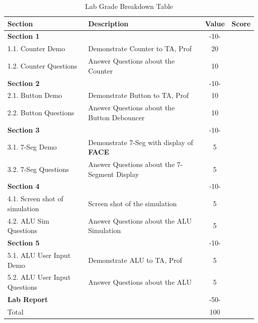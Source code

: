 \documentclass{article}
\begin{document}
\begin{table}[!htb]
  \begin{center}
    \begin{tabular}[width=0.8\textwidth]{|l|l|c|l|}
       \hline
       Section & Description & Value & Score\\
       \hline 
       \multicolumn{2}{|l}{\textbf{Section 1}}  & -10- &\\
       \hline
       1.1. Counter Demo & Demonstrate Counter to TA, Prof & 20 &\\
       1.2. Counter Questions & Answer Questions about the Counter & 10 &\\
       \hline
       \multicolumn{2}{|l}{\textbf{Section 2}}  & -10- &\\
       \hline
       2.1. Button Demo & Demonstrate Button to TA, Prof & 10 &\\
       2.2. Button Questions & Answer Questions about the Button Debouncer & 10 &\\
       \hline
       \multicolumn{2}{|l}{\textbf{Section 3}}  & -10- &\\
       \hline
       3.1. 7-Seg Demo & Demonstrate 7-Seg with display of \textbf{FACE} & 5 &\\
       3.2. 7-Seg Questions & Answer Questions about the 7-Segment Display & 5 &\\
       \hline
       \multicolumn{2}{|l}{\textbf{Section 4}}  & -10- &\\
       \hline
       4.1. Screen shot of simulation &  Screen shot of the simulation & 5 &\\
       4.2. ALU Sim Questions & Answer Questions about the ALU Simulation & 5 &\\
       \hline
       \multicolumn{2}{|l}{\textbf{Section 5}}  & -10- &\\
       \hline
       5.1. ALU User Input Demo & Demonstrate ALU to TA, Prof & 5 &\\
       5.2. ALU User Input Questions & Answer Questions about the ALU & 5 &\\
       \hline
       \multicolumn{2}{|l}{\textbf{Lab Report}}  & -50- &\\
       \hline
       \hline
       \multicolumn{2}{|l}{Total} & \multicolumn{1}{c|}{100} &\\
       \hline
    \end{tabular}
  \end{center}
  \caption{Lab Grade Breakdown Table}
\end{table}
\end{document}
